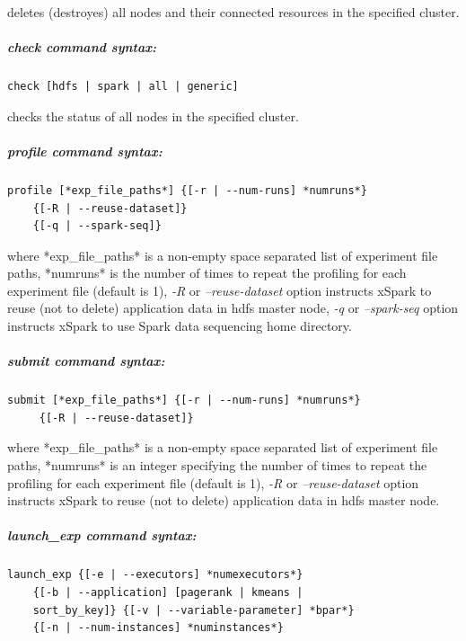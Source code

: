 deletes (destroyes) all nodes and their connected resources in the
specified cluster.

\hypertarget{check-command-syntax}{%
\subparagraph{\texorpdfstring{\emph{check} command
		syntax:}{check command syntax:}}\label{check-command-syntax}}

\begin{verbatim}
check [hdfs | spark | all | generic]
\end{verbatim}

checks the status of all nodes in the specified cluster.

\hypertarget{profile-command-syntax}{%
\subparagraph{\texorpdfstring{\emph{profile} command
		syntax:}{profile command syntax:}}\label{profile-command-syntax}}

\begin{verbatim}
profile [*exp_file_paths*] {[-r | --num-runs] *numruns*} 
    {[-R | --reuse-dataset]} 
    {[-q | --spark-seq]}      
\end{verbatim}

where *exp\_file\_paths* is a non-empty space separated list of
experiment file paths, *numruns* is the number of times to repeat the
profiling for each experiment file (default is 1), \emph{-R} or
\emph{--reuse-dataset} option instructs xSpark to reuse (not to delete)
application data in hdfs master node, \emph{-q} or \emph{--spark-seq}
option instructs xSpark to use Spark data sequencing home directory.

\hypertarget{submit-command-syntax}{%
\subparagraph{\texorpdfstring{\emph{submit} command
		syntax:}{submit command syntax:}}\label{submit-command-syntax}}

\begin{verbatim}
submit [*exp_file_paths*] {[-r | --num-runs] *numruns*} 
     {[-R | --reuse-dataset]}      
\end{verbatim}

where *exp\_file\_paths* is a non-empty space separated list of
experiment file paths, *numruns* is an integer specifying the number of
times to repeat the profiling for each experiment file (default is 1),
\emph{-R} or \emph{--reuse-dataset} option instructs xSpark to reuse
(not to delete) application data in hdfs master node.

\hypertarget{launch_exp-command-syntax}{%
\subparagraph{\texorpdfstring{\emph{launch\_exp} command
		syntax:}{launch\_exp command syntax:}}\label{launch_exp-command-syntax}}

\begin{verbatim}
launch_exp {[-e | --executors] *numexecutors*} 
    {[-b | --application] [pagerank | kmeans | 
    sort_by_key]} {[-v | --variable-parameter] *bpar*} 
    {[-n | --num-instances] *numinstances*} 
\end{verbatim}

